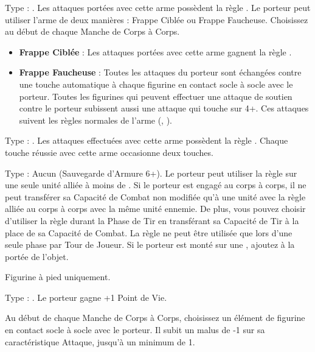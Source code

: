  Type : \halberd{}. Les attaques portées avec cette arme possèdent la règle . Le porteur peut utiliser l'arme de deux manières : Frappe Ciblée ou Frappe Faucheuse. Choisissez au début de chaque Manche de Corps à Corps.
 \begin{itemize}[label={-}]
\item \textbf{Frappe Ciblée} : Les attaques portées avec cette arme gagnent la règle .
\item \textbf{Frappe Faucheuse} : Toutes les attaques du porteur sont échangées contre une touche automatique à chaque figurine en contact socle à socle avec le porteur. Toutes les figurines qui peuvent effectuer une attaque de soutien contre le porteur subissent aussi une attaque qui touche sur 4+. Ces attaques suivent les règles normales de l'arme (\halberd{}, ).
\end{itemize}

 Type : \hw{}. Les attaques effectuées avec cette arme possèdent la règle . Chaque touche réussie avec cette arme occasionne deux touches.

\endpricelist

\armymagicalarmour

\startpricelist

 Type : Aucun (Sauvegarde d'Armure 6+). Le porteur peut utiliser la règle \undyingwill{} sur une seule unité alliée à moins de . Si le porteur est engagé au corps à corps, il ne peut transférer sa Capacité de Combat non modifiée qu'à une unité avec la règle \undead{} alliée au corps à corps avec la même unité ennemie. De plus, vous pouvez choisir d'utiliser la règle \undyingwill{} durant la Phase de Tir en transférant sa Capacité de Tir à la place de sa Capacité de Combat. La règle \undyingwill{} ne peut être utilisée que lors d'une seule phase par Tour de Joueur. Si le porteur est monté sur une \largetarget{}, ajoutez  à la portée de l'objet.

Figurine à pied uniquement.

Type : \platearmour{}. Le porteur gagne +1 Point de Vie.

\endpricelist

\armytalismans

\startpricelist

 Au début de chaque Manche de Corps à Corps, choisissez un élément de figurine en contact socle à socle avec le porteur. Il subit un malus de -1 sur sa caractéristique Attaque, jusqu'à un minimum de 1.

